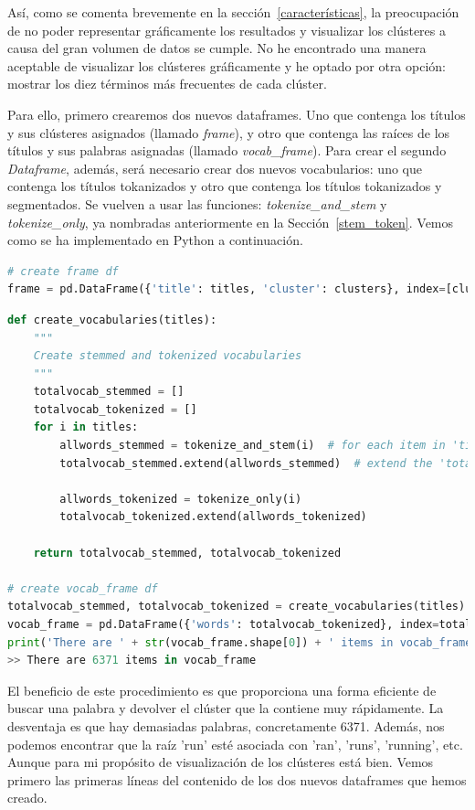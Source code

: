 \documentclass{uimppracticas}
\begin{document}
Así, como se comenta brevemente en la sección~\ref{características}, la preocupación de no poder representar gráficamente los resultados y visualizar los clústeres a causa del gran volumen de datos se cumple. No he encontrado una manera aceptable de visualizar los clústeres gráficamente y he optado por otra opción: mostrar los diez términos más frecuentes de cada clúster.

Para ello, primero crearemos dos nuevos dataframes. Uno que contenga los títulos y sus clústeres asignados (llamado \textit{frame}), y otro que contenga las raíces de los títulos y sus palabras asignadas (llamado \textit{vocab\_frame}). Para crear el segundo \textit{Dataframe}, además, será necesario crear dos nuevos vocabularios: uno que contenga los títulos tokanizados y otro que contenga los títulos tokanizados y segmentados. Se vuelven a usar las funciones: \textit{tokenize\_and\_stem} y \textit{tokenize\_only}, ya nombradas anteriormente en la Sección~\ref{stem_token}. Vemos como se ha implementado en Python a continuación.

\begin{lstlisting}[language=python]
# create frame df
frame = pd.DataFrame({'title': titles, 'cluster': clusters}, index=[clusters], columns=['title', 'cluster'])
\end{lstlisting}

\begin{lstlisting}[language=python]
def create_vocabularies(titles):
	"""
	Create stemmed and tokenized vocabularies
	"""
	totalvocab_stemmed = []
	totalvocab_tokenized = []
	for i in titles:
		allwords_stemmed = tokenize_and_stem(i)  # for each item in 'titles', tokenize/stem
		totalvocab_stemmed.extend(allwords_stemmed)  # extend the 'totalvocab_stemmed' list
	
		allwords_tokenized = tokenize_only(i)
		totalvocab_tokenized.extend(allwords_tokenized)
	
	return totalvocab_stemmed, totalvocab_tokenized

# create vocab_frame df
totalvocab_stemmed, totalvocab_tokenized = create_vocabularies(titles)
vocab_frame = pd.DataFrame({'words': totalvocab_tokenized}, index=totalvocab_stemmed)
print('There are ' + str(vocab_frame.shape[0]) + ' items in vocab_frame')
>> There are 6371 items in vocab_frame
\end{lstlisting}

El beneficio de este procedimiento es que proporciona una forma eficiente de buscar una palabra y devolver el clúster que la contiene muy rápidamente. La desventaja es que hay demasiadas palabras, concretamente 6371. Además, nos podemos encontrar que la raíz 'run' esté asociada con 'ran', 'runs', 'running', etc. Aunque para mi propósito de visualización de los clústeres está bien. Vemos primero las primeras líneas del contenido de los dos nuevos dataframes que hemos creado.
\end{document}
